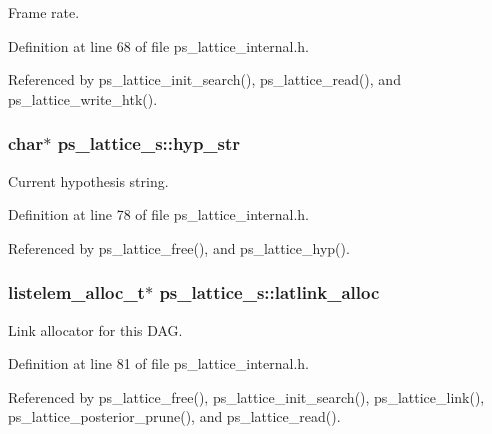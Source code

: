 Frame rate. 



Definition at line 68 of file ps\+\_\+lattice\+\_\+internal.\+h.



Referenced by ps\+\_\+lattice\+\_\+init\+\_\+search(), ps\+\_\+lattice\+\_\+read(), and ps\+\_\+lattice\+\_\+write\+\_\+htk().

\subsubsection[{hyp\+\_\+str}]{\setlength{\rightskip}{0pt plus 5cm}char$\ast$ ps\+\_\+lattice\+\_\+s\+::hyp\+\_\+str}\label{structps__lattice__s_ac3844c69f8393b607047bd9b302b979a}


Current hypothesis string. 



Definition at line 78 of file ps\+\_\+lattice\+\_\+internal.\+h.



Referenced by ps\+\_\+lattice\+\_\+free(), and ps\+\_\+lattice\+\_\+hyp().

\subsubsection[{latlink\+\_\+alloc}]{\setlength{\rightskip}{0pt plus 5cm}listelem\+\_\+alloc\+\_\+t$\ast$ ps\+\_\+lattice\+\_\+s\+::latlink\+\_\+alloc}\label{structps__lattice__s_afa8ca535dc8bf2cc656f6ad477e13b9f}


Link allocator for this D\+A\+G. 



Definition at line 81 of file ps\+\_\+lattice\+\_\+internal.\+h.



Referenced by ps\+\_\+lattice\+\_\+free(), ps\+\_\+lattice\+\_\+init\+\_\+search(), ps\+\_\+lattice\+\_\+link(), ps\+\_\+lattice\+\_\+posterior\+\_\+prune(), and ps\+\_\+lattice\+\_\+read().

